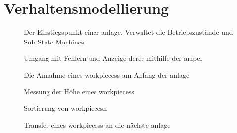 

\section{Verhaltensmodellierung}\label{sec:verhaltensmodellierung}

\begin{figure}
    \caption{Der Einstiegspunkt einer \gls{anlage}.
    Verwaltet die Betriebszustände und Sub-State Machines}
    \label{fig:stm_top_level}
\end{figure}

\begin{figure}
    \caption{Umgang mit Fehlern und Anzeige derer mithilfe der \gls{ampel}}
    \label{fig:stm_error}
\end{figure}

\begin{figure}
    \caption{Die Annahme eines \glspl{workpiece}s am Anfang der \gls{anlage}}
    \label{fig:stm_werkstueck_annahme}
\end{figure}

\begin{figure}
    \caption{Messung der Höhe eines \glspl{workpiece}s}
    \label{fig:stm_hoehe_messen}
\end{figure}

\begin{figure}
    \caption{Sortierung von \glspl{workpiece}n}
    \label{fig:stm_werkstueck_sortieren}
\end{figure}

\begin{figure}
    \caption{Transfer eines \glspl{workpiece}s an die nächste \gls{anlage}}
    \label{fig:stm_werkstueck_transfer}
\end{figure}

